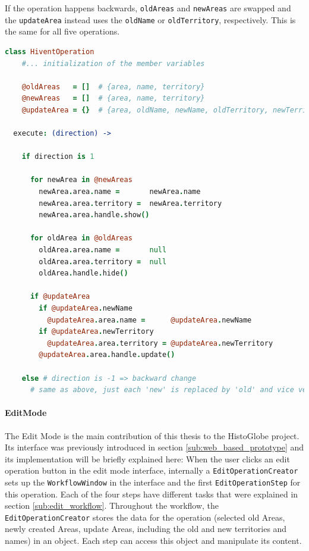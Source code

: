 If the operation happens backwards, \texttt{oldAreas} and \texttt{newAreas} are swapped and the \texttt{updateArea} instead uses the \texttt{oldName} or \texttt{oldTerritory}, respectively. This is the same for all five operations.

\begin{center}
\begin{minipage}[t]{0.8\textwidth}
\begin{lstlisting}[language=coffeescript,
  caption=Execution of an \texttt{HiventOperation},
  label=lst:hivent_operation]
class HiventOperation
    #... initialization of the member variables

    @oldAreas   = []  # {area, name, territory}
    @newAreas   = []  # {area, name, territory}
    @updateArea = {}  # {area, oldName, newName, oldTerritory, newTerritory}

  execute: (direction) ->

    if direction is 1

      for newArea in @newAreas
        newArea.area.name =       newArea.name
        newArea.area.territory =  newArea.territory
        newArea.area.handle.show()

      for oldArea in @oldAreas
        oldArea.area.name =       null
        oldArea.area.territory =  null
        oldArea.handle.hide()

      if @updateArea
        if @updateArea.newName
          @updateArea.area.name =      @updateArea.newName
        if @updateArea.newTerritory
          @updateArea.area.territory = @updateArea.newTerritory
        @updateArea.area.handle.update()

    else # direction is -1 => backward change
      # same as above, just each 'new' is replaced by 'old' and vice versa
\end{lstlisting}
\end{minipage}
\end{center}


\paragraph{EditMode} %
\label{par:editmode}

The Edit Mode is the main contribution of this thesis to the HistoGlobe project.
Its interface was previously introduced in section \ref{sub:web_based_prototype} and its implementation will be briefly explained here: When the user clicks an edit operation button in the edit mode interface, internally a \texttt{EditOperationCreator} sets up the \texttt{WorkflowWindow} in the interface and the first \texttt{EditOperationStep} for this operation. Each of the four steps have different tasks that were explained in section \ref{sub:edit_workflow}. Throughout the workflow, the \texttt{EditOperationCreator} stores the data for the operation (selected old Areas, newly created Areas, update Areas, including the old and new territories and names) in an object. Each step can access this object and manipulate its content.

